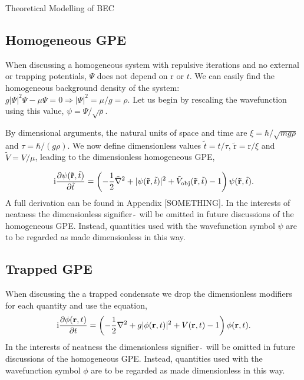 \begin{chapter}{\label{cha:theoretical_model}Theoretical Modelling of BEC}
	\subsection{\label{section:gpedimlesshomg} Homogeneous GPE}

		When discussing a homogeneous system with repulsive iterations and no external or trapping potentials, $\Psi$ does not depend on $\mathrm{r}$ or $t$. We can easily find the homogeneous background density of the system: $g|\Psi|^2\Psi - \mu\Psi = 0 \Rightarrow |\Psi|^2 = \mu/g = \rho$. Let us begin by rescaling the wavefunction using this value, $\psi = \Psi/\sqrt{\rho}$.

		By dimensional arguments, the natural units of space and time are $\xi = \hbar/\sqrt{mg\rho}$ and $\tau = \hbar/(g\rho)$. We now define dimensionless values $\tilde{t} = t/\tau$, $\tilde{\mathrm{r}} = \mathrm{r}/\xi$ and $\tilde{V} = V/\mu$, leading to the dimensionless homogeneous GPE,

		\begin{equation}\label{eq:dimgpehomg}
		\mathrm{i}\frac{\partial\psi({\bf \tilde{r}},\tilde{t})}{\partial {\tilde{t}}} = \left( -\frac{1}{2}\tilde{\nabla}^2 + |\psi({\bf \tilde{r}},\tilde{t})|^2 + \tilde{V}_{\mathrm{obj}}({\bf \tilde{r}},\tilde{t}) - 1 \right) \psi({\bf \tilde{r}},\tilde{t}).
		\end{equation}
		A full derivation can be found in Appendix [SOMETHING]. In the interests of neatness the dimensionless signifier $\tilde{~}$ will be omitted in future discussions of the homogeneous GPE. Instead, quantities used with the wavefunction symbol $\psi$ are to be regarded as made dimensionless in this way.


	\subsection{\label{section:gpedimlesstrap} Trapped GPE}
		When discussing the a trapped condensate we drop the dimensionless modifiers for each quantity and use the equation,
		\begin{equation}\label{eq:dimgpetrapped}
		\mathrm{i}\frac{\partial\phi({\bf r},t)}{\partial t} = \left( -\frac{1}{2}\nabla^2 + g|\phi({\bf r},t)|^2 + V({\bf r},t) - 1 \right) \phi({\bf r},t).
		\end{equation}
	In the interests of neatness the dimensionless signifier $\hat{~}$ will be omitted in future discussions of the homogeneous GPE. Instead, quantities used with the wavefunction symbol $\phi$ are to be regarded as made dimensionless in this way.


\end{chapter}
